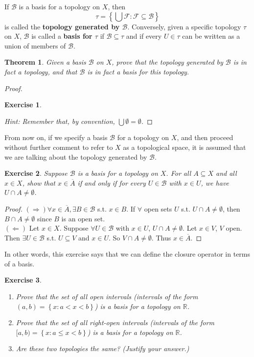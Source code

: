 \documentclass[12pt]{amsart}
\newtheorem{theorem}{Theorem}[section]
\newtheorem{exercise}{Exercise}[section]
\theoremstyle{definition}
\theoremstyle{remark}
\newcommand{\R}{\mathbb{R}}
\newcommand{\explicitSet}[1]{\left\lbrace #1 \right\rbrace}
\newcommand{\set}[2]{\explicitSet{#1 \colon #2}}
\newcommand{\0}{\emptyset}
\newcommand{\closure}[1]{\overline{#1}}
\newcommand{\F}{\mathcal F}
\newcommand{\B}{\mathcal B}
\begin{document}
If $\B$ is a basis for a topology on $X$, then
$$\tau = \set{\bigcup \F}{\F \subseteq \B}$$
is called the \textbf{topology generated by $\B$}. Conversely, given a specific topology $\tau$ on $X$, $\B$ is called a \textbf{basis for $\tau$} if $\B \subseteq \tau$ and if every $U \in \tau$ can be written as a union of members of $\B$.

\begin{theorem}
Given a basis $\B$ on $X$, prove that the topology generated by $\B$ is in fact a topology, and that $\B$ is in fact a basis for this topology.
\end{theorem}
\begin{proof}
\begin{exercise}\end{exercise}
\emph{Hint: Remember that, by convention, $\bigcup \0 = \0$.}
\end{proof}

From now on, if we specify a basis $\B$ for a topology on $X$, and then proceed without further comment to refer to $X$ as a topological space, it is assumed that we are talking about the topology generated by $\B$.

\begin{exercise}
Suppose $\B$ is a basis for a topology on $X$. For all $A \subseteq X$ and all $x \in X$, show that $x \in \closure{A}$ if and only if for every $U \in \B$ with $x \in U$, we have $U \cap A \neq \0$.
\end{exercise}
\begin{proof}
	$(\Rightarrow) \forall x \in \overline{A}, \exists B \in \B$ s.t. $x \in B$. If $\forall$ open sets $U$ s.t. $U \cap A \neq \0$, then $B\cap A \neq \0$ since $B$ is an open set.
	\\$(\Leftarrow)$ Let $x \in X$. Suppose $\forall U \in \B$ with $x \in U$, $U\cap A \neq \0$. Let $x \in V$, $V$ open. Then $\exists U \in \B$ s.t. $U \subseteq V$ and $x \in U$. So $V \cap A \neq \0$. Thus $x \in \overline{A}$.
\end{proof}

In other words, this exercise says that we can define the closure operator in terms of a basis.

\begin{exercise}
\begin{enumerate}
\item Prove that the set of all open intervals (intervals of the form $(a,b) = \set{x}{a < x < b}$) is a basis for a topology on $\R$.
\item Prove that the set of all right-open intervals (intervals of the form $[a,b) = \set{x}{a \leq x < b}$) is a basis for a topology on $\R$.
\item Are these two topologies the same? (Justify your answer.)
\end{enumerate}
\end{exercise}
\end{document}
